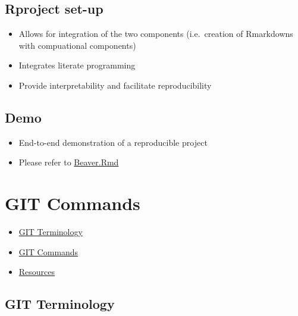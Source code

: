 \documentclass[
]{book}
\providecommand{\tightlist}{%
  \setlength{\itemsep}{0pt}\setlength{\parskip}{0pt}}
\begin{document}
\hypertarget{rproject-set-up}{%
\section{Rproject set-up}\label{rproject-set-up}}

\begin{itemize}
\tightlist
\item
  Allows for integration of the two components (i.e.~creation of Rmarkdowns with compuational components)
\item
  Integrates literate programming
\item
  Provide interpretability and facilitate reproducibility
\end{itemize}

\hypertarget{demo}{%
\section{Demo}\label{demo}}

\begin{itemize}
\tightlist
\item
  End-to-end demonstration of a reproducible project
\item
  Please refer to \href{Beavers.Rmd}{Beaver.Rmd}
\end{itemize}

\hypertarget{git-commands}{%
\chapter{GIT Commands}\label{git-commands}}

\begin{itemize}
\tightlist
\item
  \protect\hyperlink{git-terminology}{GIT Terminology}
\item
  \protect\hyperlink{git-commands}{GIT Commands}
\item
  \protect\hyperlink{resources}{Resources}
\end{itemize}

\hypertarget{git-terminology}{%
\section{GIT Terminology}\label{git-terminology}}
\end{document}
